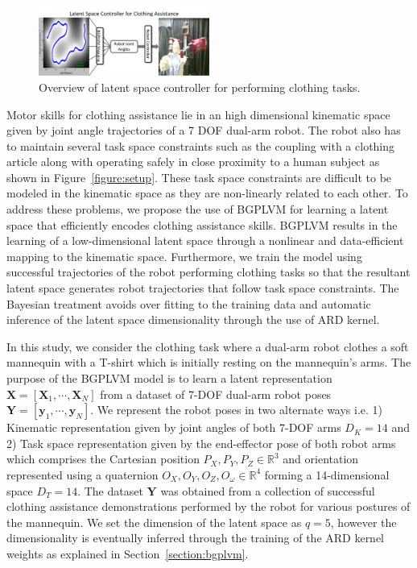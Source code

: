 \documentclass{article}
\begin{document}
\begin{figure}[t]
  \centering
  \includegraphics[width=0.5\textwidth]{controller.png}
  \caption{Overview of latent space controller for performing clothing tasks.}
  \label{figure:realtime}
\end{figure}

Motor skills for clothing assistance lie in an high dimensional kinematic space given by joint angle trajectories of a 7 DOF dual-arm robot. The robot also has to maintain several task space constraints such as the coupling with a clothing article along with operating safely in close proximity to a human subject as shown in Figure~\ref{figure:setup}. These task space constraints are difficult to be modeled in the kinematic space as they are non-linearly related to each other. To address these problems, we propose the use of BGPLVM for learning a latent space that efficiently encodes clothing assistance skills. BGPLVM results in the learning of a low-dimensional latent space through a nonlinear and data-efficient mapping to the kinematic space. Furthermore, we train the model using successful trajectories of the robot performing clothing tasks so that the resultant latent space generates robot trajectories that follow task space constraints. The Bayesian treatment avoids over fitting to the training data and automatic inference of the latent space dimensionality through the use of ARD kernel.

In this study, we consider the clothing task where a dual-arm robot clothes a soft mannequin with a T-shirt which is initially resting on the mannequin's arms. The purpose of the BGPLVM model is to learn a latent representation $\mathbf{X} = [\mathbf{X}_1, \cdots, \mathbf{X}_N]$ from a dataset of 7-DOF dual-arm robot poses $\mathbf{Y} = [\mathbf{y}_1, \cdots, \mathbf{y}_N]$. We represent the robot poses in two alternate ways i.e. 1) Kinematic representation given by joint angles of both 7-DOF arms $D_K = 14$ and 2) Task space representation given by the end-effector pose of both robot arms which comprises the Cartesian position ${P_X,P_Y,P_Z} \in \mathbb{R}^3$ and orientation represented using a quaternion ${O_X,O_Y,O_Z,O_{\omega}} \in \mathbb{R}^4$ forming a 14-dimensional space $D_T = 14$. The dataset $\mathbf{Y}$ was obtained from a collection of successful clothing assistance demonstrations performed by the robot for various postures of the mannequin. We set the dimension of the latent space as $q = 5$, however the dimensionality is eventually inferred through the training of the ARD kernel weights as explained in Section~\ref{section:bgplvm}.
\end{document}
